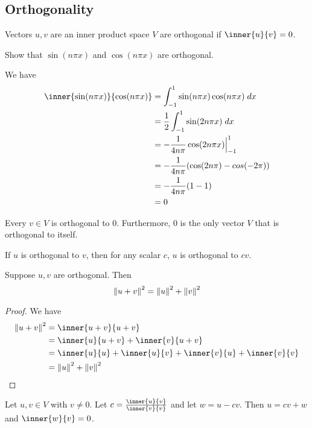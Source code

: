 \documentclass{article}
\begin{document}
    \subsection{Orthogonality}
    \begin{definition}
      Vectors $u, v$ are an inner product space $V$ are orthogonal if $\inner{u}{v} = 0$.
    \end{definition}
    \begin{example}
      Show that $\sin (n\pi x)$ and $\cos (n\pi x)$ are orthogonal.

      We have
      \begin{align*}
        \inner{\sin (n\pi x)}{\cos (n\pi x)} &= \int_{-1}^1 \sin (n\pi x) \cos (n\pi x) \; dx\\
        &= \frac{1}{2}\int_{-1}^1 \sin(2n\pi x) \; dx\\
        &= -\frac{1}{4n\pi}\cos(2n\pi x)\Big|_{-1}^1\\
        &= -\frac{1}{4n\pi}(\cos(2n\pi) - cos(-2\pi))\\
        &= -\frac{1}{4n\pi}(1-1)\\
        &= 0
      \end{align*}
    \end{example}
    \begin{theorem}
      Every $v \in V$ is orthogonal to $0$. Furthermore, $0$ is the only vector $V$ that is orthogonal to itself.
    \end{theorem}
    \begin{theorem}
      If $u$ is orthogonal to $v$, then for any scalar $c$, $u$ is orthogonal to $cv$.
    \end{theorem}
    \begin{theorem}
      Suppose $u, v$ are orthogonal. Then \[
        \norm{u + v}^2 = \norm{u}^2 + \norm{v}^2
      \]
    \end{theorem}
    \begin{proof}
      We have
      \begin{align*}
        \norm{u+v}^2 &= \inner{u+v}{u+v}\\
        &= \inner{u}{u+v} + \inner{v}{u+v}\\
        &= \inner{u}{u} + \inner{u}{v} + \inner{v}{u} + \inner{v}{v}\\
        &= \norm{u}^2 + \norm{v}^2
      \end{align*}
    \end{proof}
    \begin{theorem}
      Let $u, v \in V$ with $v \neq 0$. Let $c = \frac{\inner{u}{v}}{\inner{v}{v}}$ and let $w = u -cv$. Then $u = cv + w$ and $\inner{w}{v} = 0$.
    \end{theorem}
\end{document}
